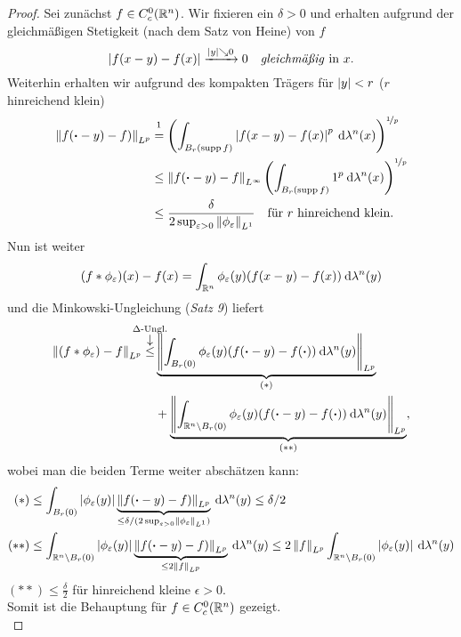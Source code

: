 \documentclass[skript.tex]{subfiles}
\begin{document}
	\begin{proof}
		Sei zunächst $f \in C_c^0(\mathbb{R}^n)$. Wir fixieren ein $\delta>0$ und erhalten aufgrund der gleichmäßigen Stetigkeit (nach dem Satz von Heine) von $f$
		\[
			\left| f(x-y)-f(x) \right| \xrightarrow{\left| y \right|\searrow0} 0\quad\text{\emph{gleichmäßig} in } x.
		\]
		Weiterhin erhalten wir aufgrund des kompakten Trägers für $\left| y \right| < r$ ($r$ hinreichend klein)
		\begin{align*}
			\norm{f(\bcdot-y)-f)}_{L^p} &\overset{\footnotemark}{=}
			 \left(\int_{B_r(\supp f)}\abs{f(x-y)-f(x)}^p \md\lambda^n(x)\right)^{\nicefrac{1}{p}}\\
			&\leq \norm{f(\bcdot-y)-f}_{L^\infty}\left(\int_{B_r(\supp f)}1^p\md\lambda^n(x)\right)^{\nicefrac{1}{p}}\\
			&\leq \frac{\delta}{2\sup_{\epsilon>0}\norm{\phi_\epsilon}_{L^1}}\quad\text{für $r$ hinreichend klein.}
		\end{align*}
		\newpage
		Nun ist weiter
		\[
			(f\ast\phi_\varepsilon)(x)-f(x) = \int_{\mathbb{R}^n} \phi_\varepsilon(y)(f(x-y)-f(x)) \: \mathrm{d}\lambda^n(y)
		\]
		und die Minkowski-Ungleichung (\emph{Satz 9}) liefert
		\begin{align*}
			\norm{(f\ast\phi_\epsilon)-f}_{L^p} \darrow{\text{$\Delta$-Ungl.}}{\leq}& \underbrace{
				\norm{\int_{B_r(0)} \phi_\epsilon(y)(f(\bcdot-y)-f(\bcdot)) \md\lambda^n(y)}_{L^p}
			}_{(\ast)}\\
			&+\underbrace{
			\norm{\int_{\mbb{R}^n \setminus B_r(0)} \phi_\epsilon(y)(f(\bcdot-y)-f(\bcdot)) \md\lambda^n(y)}_{L^p}
			}_{(\ast\ast)},
		\end{align*}
		wobei man die beiden Terme weiter abschätzen kann:
		\begin{align*}
			(\ast) &\leq \int_{B_r(0)}\left| \phi_\varepsilon(y) \right|\underbrace{\left\lVert f(\boldsymbol{\cdot}-y)-f) \right\rVert_{L^p}}_{\leq \delta/(2\sup_{\varepsilon>0}\left\lVert \phi_\varepsilon \right\rVert_{L^1})} \: \mathrm{d}\lambda^n(y) \leq \delta/2 \\
			(\ast\ast) &\leq \int_{\mathbb{R}^n\setminus B_r(0)}\left| \phi_\varepsilon(y) \right|\underbrace{\left\lVert f(\boldsymbol{\cdot}-y)-f) \right\rVert_{L^p}}_{\leq 2\left\lVert f \right\rVert_{L^p}} \: \mathrm{d}\lambda^n(y) \leq 2\left\lVert f \right\rVert_{L^p} \int_{\mathbb{R}^n\setminus B_r(0)}\left| \phi_\varepsilon(y) \right| \: \mathrm{d}\lambda^n(y)
		\end{align*}
		$(\ast\ast)\leq\frac{\delta}{2}$ für hinreichend kleine $\epsilon>0$.\\
		Somit ist die Behauptung für $f \in C_c^0(\mathbb{R}^n)$ gezeigt.\\

\end{proof}
\end{document}
